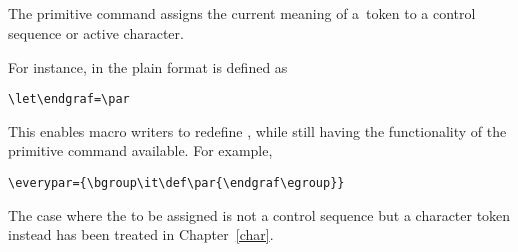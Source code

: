 \documentclass[letterpaper]{book}
\begin{document}
\subsection{\protect{}}
\label{let}

The primitive command  assigns the current meaning
of a~token to a control sequence or active character.

For instance, in the plain format  is defined
as
\begin{verbatim}
\let\endgraf=\par
\end{verbatim}
This enables macro writers to redefine , while
still having the functionality of the primitive 
command available. For example,
\begin{verbatim}
\everypar={\bgroup\it\def\par{\endgraf\egroup}}
\end{verbatim}

The case where the  to be assigned is not a control
sequence but a character token instead has been treated 
in Chapter~\ref{char}.

\subsection{\protect{}}
\end{document}
